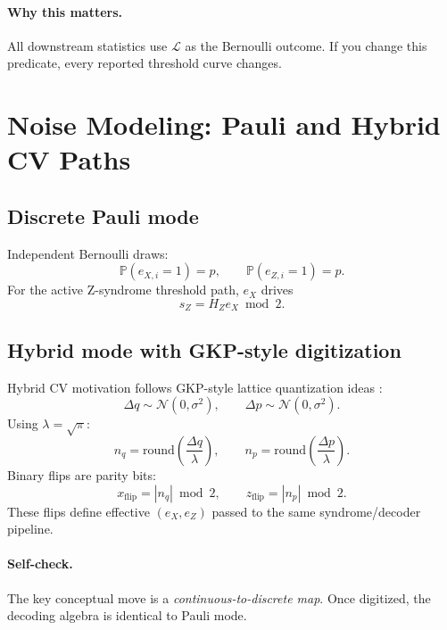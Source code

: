 \documentclass[11pt]{article}
\newcommand{\Prb}{\mathbb{P}}
\begin{document}
\paragraph{Why this matters.}
All downstream statistics use $\mathcal{L}$ as the Bernoulli outcome. If you change this predicate, every reported threshold curve changes.

\section{Noise Modeling: Pauli and Hybrid CV Paths}
\subsection{Discrete Pauli mode}
Independent Bernoulli draws:
\begin{equation}
\Prb(e_{X,i}=1)=p,\qquad \Prb(e_{Z,i}=1)=p.
\end{equation}
For the active Z-syndrome threshold path, $e_X$ drives
\begin{equation}
s_Z=H_Ze_X\bmod 2.
\end{equation}

\subsection{Hybrid mode with GKP-style digitization}
Hybrid CV motivation follows GKP-style lattice quantization ideas \cite{gkp2001}:
\begin{equation}
\Delta q\sim\mathcal N(0,\sigma^2),\qquad
\Delta p\sim\mathcal N(0,\sigma^2).
\end{equation}
Using $\lambda=\sqrt{\pi}$:
\begin{equation}
n_q=\mathrm{round}\!\left(\frac{\Delta q}{\lambda}\right),\qquad
n_p=\mathrm{round}\!\left(\frac{\Delta p}{\lambda}\right).
\end{equation}
Binary flips are parity bits:
\begin{equation}
x_{\mathrm{flip}}=|n_q|\bmod 2,\qquad z_{\mathrm{flip}}=|n_p|\bmod 2.
\end{equation}
These flips define effective $(e_X,e_Z)$ passed to the same syndrome/decoder pipeline.

\paragraph{Self-check.}
The key conceptual move is a \emph{continuous-to-discrete map}. Once digitized, the decoding algebra is identical to Pauli mode.
\end{document}
